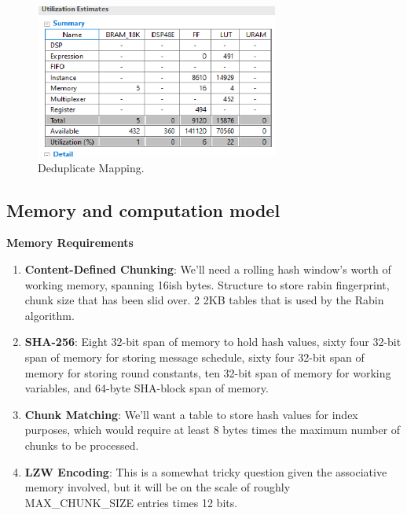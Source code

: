 \documentclass{article}
\begin{document}
\begin{figure}[h!]
  \includegraphics[width=80mm, scale=0.5]{deduplicate.png}
  \caption{Deduplicate Mapping.}
  \label{fig:deduplicate_mapping}
\end{figure}

\subsection{Memory and computation model}
\item%
\textbf{Memory Requirements}
\begin{enumerate}[label=(\roman*)]
\item%
\textbf{Content-Defined Chunking}:\newline
We'll need a rolling hash window's worth of working memory, spanning 16ish bytes.
Structure to store rabin fingerprint, chunk size that has been slid over.
2 2KB tables that is used by the Rabin algorithm.
\item%
\textbf{SHA-256}:\newline
Eight 32-bit span of memory to hold hash values, 
sixty four 32-bit span of memory for storing message schedule,
sixty four 32-bit span of memory for storing round constants,
ten 32-bit span of memory for working variables, and
64-byte SHA-block span of memory.

\item%
\textbf{Chunk Matching}:\newline
We'll want a table to store hash values for index purposes, which would require at least 8 bytes times the maximum number of chunks to be processed.

\item%
\textbf{LZW Encoding}:\newline
This is a somewhat tricky question given the associative memory involved, but it will be on the scale of roughly MAX\_CHUNK\_SIZE entries times 12 bits.

\end{enumerate}%
\end{document}
